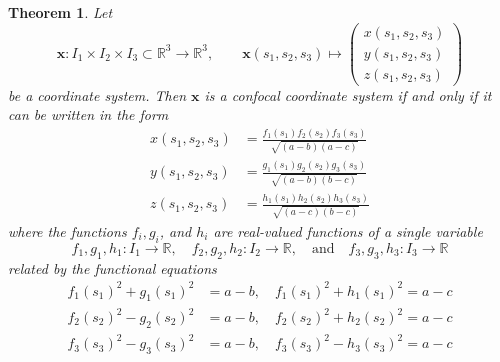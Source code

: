 \documentclass[10pt, a4paper]{article}
\theoremstyle{BoldTopSpacing}
\newtheorem{theorem}{Theorem}[section]
\theoremstyle{BoldTopSpacing}
\theoremstyle{BoldTopSpacing}
\theoremstyle{BoldTopBottomSpacing}
\theoremstyle{BoldTopSpacing}
\theoremstyle{BoldTopBottomSpacing}
\theoremstyle{remark}
\begin{document}
\begin{theorem}
\label{thm:main-confocal-system}
Let
\[
\boldsymbol{x} : I_{1} \times I_{2} \times I_{3} \subset \mathbb{R}^3 \to \mathbb{R}^3, \quad \quad \boldsymbol{x}(s_{1}, s_{2}, s_{3}) \mapsto \begin{pmatrix}
x(s_{1}, s_{2}, s_{3}) \\
y(s_{1}, s_{2}, s_{3}) \\
z(s_{1}, s_{2}, s_{3})
\end{pmatrix}
\]
be a coordinate system. Then $\boldsymbol{x}$ is a confocal coordinate system if and only if it can be written in the form
\begin{equation}
\begin{aligned}
\label{eq:main-parameterization}
x(s_{1}, s_{2}, s_{3}) &= \frac{f_{1}(s_{1}) f_{2}(s_{2}) f_{3}(s_{3})}{\sqrt{(a - b) (a - c)}} \\
y(s_{1}, s_{2}, s_{3}) &= \frac{g_{1}(s_{1}) g_{2}(s_{2}) g_{3}(s_{3})}{\sqrt{(a - b) (b - c)}} \\
z(s_{1}, s_{2}, s_{3}) &= \frac{h_{1}(s_{1}) h_{2}(s_{2}) h_{3}(s_{3})}{\sqrt{(a - c) (b - c)}}
\end{aligned}
\end{equation}
where the functions $f_{i}, g_{i}$, and $h_{i}$ are real-valued functions of a single variable
\[
f_{1}, g_{1}, h_{1} : I_{1} \to \mathbb{R}, \quad f_{2}, g_{2}, h_{2} : I_{2} \to \mathbb{R}, \quad \text{and} \quad f_{3}, g_{3}, h_{3} : I_{3} \to \mathbb{R}
\]
related by the functional equations
\begin{equation}
\begin{aligned}
\label{eq:functional-relations}
f_{1}(s_{1})^2 + g_{1}(s_{1})^2 &= a - b, \quad f_{1}(s_{1})^2 + h_{1}(s_{1})^2 = a - c \\
f_{2}(s_{2})^2 - g_{2}(s_{2})^2 &= a - b, \quad f_{2}(s_{2})^2 + h_{2}(s_{2})^2 = a - c \\
f_{3}(s_{3})^2 - g_{3}(s_{3})^2 &= a - b, \quad f_{3}(s_{3})^2 - h_{3}(s_{3})^2 = a - c
\end{aligned}
\end{equation}
\end{theorem}
\end{document}

